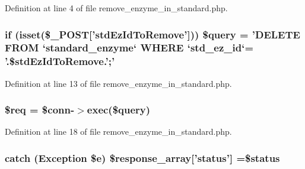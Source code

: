 Definition at line 4 of file remove\-\_\-enzyme\-\_\-in\-\_\-standard.\-php.

\hypertarget{remove__enzyme__in__standard_8php_a46a28a65a24f7a31388b22d12d2bb16a}{
\subsubsection[{\$query}]{\setlength{\rightskip}{0pt plus 5cm}if (isset(\$\-\_\-\-P\-O\-S\-T\mbox{[}'std\-Ez\-Id\-To\-Remove'\mbox{]})) \$query = 'D\-E\-L\-E\-T\-E F\-R\-O\-M `standard\-\_\-enzyme` W\-H\-E\-R\-E `std\-\_\-ez\-\_\-id`= '.\$std\-Ez\-Id\-To\-Remove.';'}}\label{remove__enzyme__in__standard_8php_a46a28a65a24f7a31388b22d12d2bb16a}


Definition at line 13 of file remove\-\_\-enzyme\-\_\-in\-\_\-standard.\-php.

\hypertarget{remove__enzyme__in__standard_8php_a63a7a283ea5dee8af1e2d5a3435bf370}{
\subsubsection[{\$req}]{\setlength{\rightskip}{0pt plus 5cm}\$req = \$conn-\/$>$exec(\$query)}}\label{remove__enzyme__in__standard_8php_a63a7a283ea5dee8af1e2d5a3435bf370}


Definition at line 18 of file remove\-\_\-enzyme\-\_\-in\-\_\-standard.\-php.

\hypertarget{remove__enzyme__in__standard_8php_a8452fb8131316637a04e25f5fde066d9}{
\subsubsection[{\$response\-\_\-array}]{\setlength{\rightskip}{0pt plus 5cm}catch (Exception \$e) \$response\-\_\-array\mbox{[}'status'\mbox{]} =\$status}}\label{remove__enzyme__in__standard_8php_a8452fb8131316637a04e25f5fde066d9}


